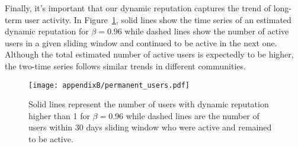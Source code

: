 Finally, it's important that our dynamic reputation captures the trend of long-term user activity. In Figure~\ref{fig:active-users}, solid lines show the time series of an estimated dynamic reputation for $\beta = 0.96$ while dashed lines show the number of active users in a given sliding window and continued to be active in the next one. Although the total estimated number of active users is expectedly to be higher, the two-time series follows similar trends in different communities.

\begin{figure}[H]
	\centering
	\texttt{[image: appendixB/permanent\_users.pdf]}
	\caption[Number of users in Stack Exchange community who remain to be active]{Solid lines represent the number of users with dynamic reputation higher than 1 for $\beta=0.96$ while dashed lines are the number of users within 30 days sliding window who were active and remained to be active.}
	\label{fig:active-users}
\end{figure}

\clearpage
